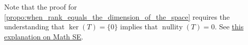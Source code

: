\documentclass[notoc,notitlepage]{tufte-book}
\DeclareMathOperator{\nullity}{nullity}
\begin{document}
Note that the proof for \cref{propo:when_rank_equals_the_dimension_of_the_space}
requires the understanding that $\ker(T) = \{ 0 \}$ implies that $\nullity(T) = 0$.
See \href{https://math.stackexchange.com/questions/664594/why-mathbf0-has-dimension-zero}{this explanation on Math SE}.



\backmatter

\pagestyle{plain}

\nobibliography*


\printindex
\end{document}
